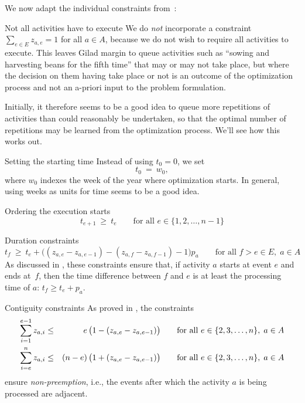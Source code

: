 \documentclass[11pt,reqno]{amsart}
\numberwithin{equation}{section}
\begin{document}
We now adapt the individual constraints from~\cite{artigues-etal11}:



\begin{mydesc}

\item[Not all activities have to execute] We do \emph{not} incorporate a constraint
  $\sum_{e\in E} z_{a,e}=1$ for all $a\in A$, because we do not wish to require all
  activities to execute. This leaves Gilad margin to queue activities such as ``sowing and
  harvesting beans for the fifth time'' that may or may not take place, but where the
  decision on them having take place or not is an outcome of the optimization process and
  not an a-priori input to the problem formulation.

  Initially, it therefore seems to be a good idea to queue more repetitions of activities
  than could reasonably be undertaken, so that the optimal number of repetitions may be
  learned from the optimization process. We'll see how this works out.

\item[Setting the starting time] Instead of using $t_0=0$, we set
  \begin{equation}
     t_0
     \ = \
     w_0,
  \end{equation}
  where $w_0$ indexes the week of the year where optimization starts. In general, using
  weeks as units for time seems to be a good idea.

\item[Ordering the execution starts]
  \begin{equation}
     t_{e+1} 
     \ \ge \
     t_e
     \qquad\text{for all }
      e\in\{1,2,\dots,n-1\}
  \end{equation}

\item[Duration constraints]
  \begin{equation}
     t_f 
     \ \ge \
     t_e + \big((z_{a,e} - z_{a,e-1} ) - (z_{a,f} - z_{a,f-1}) - 1\big) p_a
     \qquad\text{for all } f>e\in E,\; a\in A
  \end{equation}
  As discussed in \cite{artigues-etal11}, these constraints ensure that,
if activity $a$ starts at event $e$ and ends at~$f$, then the time difference between  $f$
and $e$ is at least the processing time of $a$: $t_f \ge t_e + p_a$.

\item[Contiguity constraints] As proved in \cite[Proposition 1]{artigues-etal11a}, the
  constraints
  \begin{eqnarray}
    \sum_{i=1}^{e-1} z_{a,i}
    &\le&
    \phantom{(n-e)}\llap{$e$}\,\big(1-(z_{a,e} - z_{a,e-1})\big)
    \qquad\text{for all } e\in\{2,3,\dots, n\},\; a\in A
    \\
    \sum_{i=e}^n z_{a,i}
    &\le&
    (n-e)\,\big(1+(z_{a,e} - z_{a,e-1})\big)
    \qquad\text{for all } e\in\{2,3,\dots, n\},\; a\in A
  \end{eqnarray}
  ensure \emph{non-preemption}, i.e., the events after which the activity $a$ is being
  processed are adjacent.


\end{mydesc}
\end{document}
